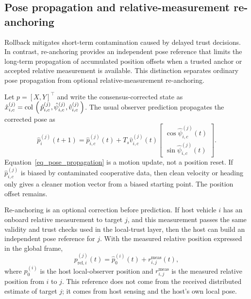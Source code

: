 \documentclass[letterpaper,journal]{IEEEtran}
\def\col#1{\mathop{{\rm col}\,\left(\,#1\,\right)}}
\begin{document}
\subsection{Pose propagation and relative-measurement re-anchoring}
Rollback mitigates short-term contamination caused by delayed trust decisions. In contrast, re-anchoring provides an independent pose reference that limits the long-term propagation of accumulated position offsets when a trusted anchor or accepted relative measurement is available. This distinction separates ordinary pose propagation from optional relative-measurement re-anchoring.


Let $p=[X,Y]^\top$ and write the consensus-corrected state as
$\hat{x}_{i,c}^{(j)}=\col{\hat p_{i,c}^{(j)},\hat\psi_{i,c}^{(j)},\hat v_{i,c}^{(j)}}$.
The usual observer prediction propagates the corrected pose as
\begin{equation}
    \hat p_i^{(j)}(t+1)
    =
    \hat p_{i,c}^{(j)}(t)
    +T_s\hat v_{i,c}^{(j)}(t)
    \begin{bmatrix}
        \cos \hat\psi_{i,c}^{(j)}(t)\\
        \sin \hat\psi_{i,c}^{(j)}(t)
    \end{bmatrix}.
    \label{eq_pose_propagation}
\end{equation}
Equation~\eqref{eq_pose_propagation} is a motion update, not a position reset. If $\hat p_{i,c}^{(j)}$ is biased by contaminated cooperative data, then clean velocity or heading only gives a cleaner motion vector from a biased starting point. The position offset remains.

Re-anchoring is an optional correction before prediction. If host vehicle $i$ has an onboard relative measurement to target $j$, and this measurement passes the same validity and trust checks used in the local-trust layer, then the host can build an independent pose reference for $j$. With the measured relative position expressed in the global frame,
\begin{equation}
    p_{\mathrm{rel},i}^{(j)}(t)
    =
    \hat p_0^{(i)}(t)+r_{i,j}^{\mathrm{meas}}(t),
    \label{eq_relative_pose_anchor}
\end{equation}
where $\hat p_0^{(i)}$ is the host local-observer position and $r_{i,j}^{\mathrm{meas}}$ is the measured relative position from $i$ to $j$. This reference does not come from the received distributed estimate of target $j$; it comes from host sensing and the host's own local pose.
\end{document}
